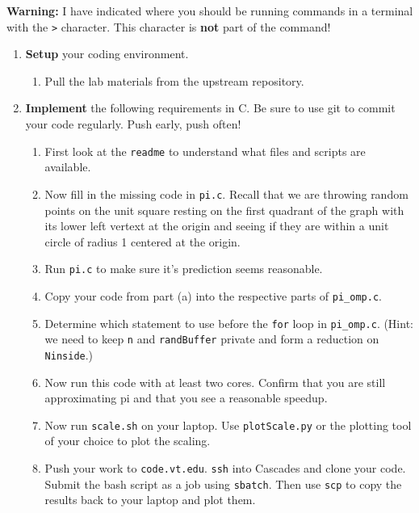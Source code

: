 \documentclass[letter]{article}
\begin{document}
\textbf{Warning:} I have indicated where you should be running commands in a terminal with the \texttt{>} character.  This character is \textbf{not} part of the command!

\begin{enumerate}

    \item \textbf{Setup} your coding environment.
        \begin{enumerate}
            \item Pull the lab materials from the upstream repository.
        \end{enumerate}

    \item \textbf{Implement} the following requirements in C.  Be sure to use git to commit your code regularly.  Push early, push often!
        \begin{enumerate}
            \item First look at the \texttt{readme} to understand what files and scripts are available.
            \item Now fill in the missing code in \texttt{pi.c}. Recall that we are throwing random points on the unit square resting on the first quadrant of the graph with its lower left vertext at the origin and seeing if they are within a unit circle of radius 1 centered at the origin. 
            \item Run \texttt{pi.c} to make sure it's prediction seems reasonable.
            \item Copy your code from part (a) into the respective parts of \texttt{pi\_omp.c}.
            \item Determine which statement to use before the \texttt{for} loop in \texttt{pi\_omp.c}. (Hint: we need to keep \texttt{n} and \texttt{randBuffer} private and form a reduction on \texttt{Ninside}.)
            \item Now run this code with at least two cores. Confirm that you are still approximating pi and that you see a reasonable speedup.
            \item Now run \texttt{scale.sh} on your laptop. Use \texttt{plotScale.py} or the plotting tool of your choice to plot the scaling.
            \item Push your work to \texttt{code.vt.edu}. \texttt{ssh} into Cascades and clone your code. Submit the bash script as a job using \texttt{sbatch}. Then use \texttt{scp} to copy the results back to your laptop and plot them.  
        \end{enumerate}
            

\end{enumerate}
\end{document}

